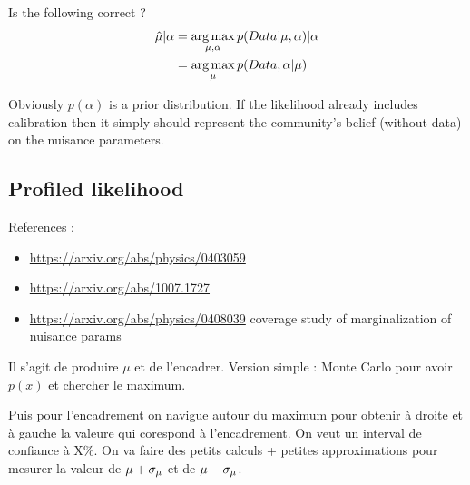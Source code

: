 Is the following correct ?
\begin{align}
	\hat\mu | \alpha &= \operatorname*{arg\,max}_{\mu, \alpha} p(Data | \mu, \alpha) | \alpha \\
		&= \operatorname*{arg\,max}_{\mu} p(Data , \alpha | \mu)
\end{align}

Obviously $p(\alpha)$ is a prior distribution.
If the likelihood already includes calibration then it simply should represent the community's belief (without data) on the nuisance parameters.





\subsection{Profiled likelihood} %
\label{sub:profiled_likelihood}




References : 
\begin{itemize}
	\item \url{https://arxiv.org/abs/physics/0403059}
	\item \url{https://arxiv.org/abs/1007.1727}
	\item \url{https://arxiv.org/abs/physics/0408039} coverage study of marginalization of nuisance params
\end{itemize}


Il s'agit de produire $\mu$ et de l'encadrer.
Version simple : Monte Carlo pour avoir $p(x)$ et chercher le maximum.

Puis pour l'encadrement on navigue autour du maximum pour obtenir à droite et à gauche la valeure qui corespond à l'encadrement.
On veut un interval de confiance à X\%.
On va faire des petits calculs + petites approximations pour mesurer la valeur de $\mu + \sigma_\mu$ et de $\mu - \sigma_\mu$.







